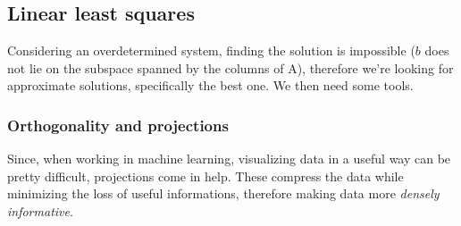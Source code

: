\documentclass[11pt]{article}
\begin{document}
\subsection{Linear least squares}
Considering an overdetermined system, finding the solution is impossible ($b$ does not lie on the subspace spanned by the columns of A), therefore we're looking for approximate solutions, specifically the best one. We then need some tools.

\subsubsection{Orthogonality and projections}
Since, when working in machine learning, visualizing data in a useful way can be pretty difficult, projections come in help. These compress the data while minimizing the loss of useful informations, therefore making data more \textit{densely informative}. 
\end{document}
